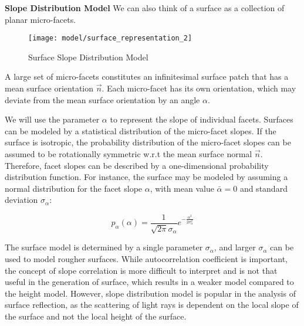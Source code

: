 

\textbf{Slope Distribution Model} We can also think of a surface as a collection of planar micro-facets.

\begin{figure}[h]
\centering
\texttt{[image: model/surface\_representation\_2]}
\caption{Surface Slope Distribution Model}
\end{figure}

A large set of micro-facets constitutes an infinitesimal surface patch that has a mean surface orientation $\vec{n}$. Each micro-facet has its own orientation, which may deviate from the mean surface orientation by an angle $\alpha$. 

We will use the parameter $\alpha$ to represent the slope of individual facets. Surfaces can be modeled by a statistical distribution of the micro-facet slopes. If the surface is isotropic, the probability distribution of the micro-facet slopes can be assumed to be rotationally symmetric w.r.t the mean surface normal $\vec{n}$.  Therefore, facet slopes can be described by a one-dimensional probability distribution function. For instance, the surface may be modeled by assuming a normal distribution for the facet slope $\alpha$, with mean value $\bar{\alpha}=0$ and standard deviation $\sigma_\alpha$:

$$
p_\alpha(\alpha)=\frac{1}{\sqrt{2\pi}\sigma_\alpha}e^{-\frac{\alpha^2}{2\sigma_\alpha^2}}
$$

The surface model is determined by a single parameter $\sigma_\alpha$, and larger $\sigma_\alpha$ can be used to model rougher surfaces. While autocorrelation coefficient is important, the concept of slope correlation is more difficult to interpret and is not that useful in the generation of surface, which results in a weaker model compared to the height model. However, slope distribution model is popular in the analysis of surface reflection, as the scattering of light rays is dependent on the local slope of the surface and not the local height of the surface.



